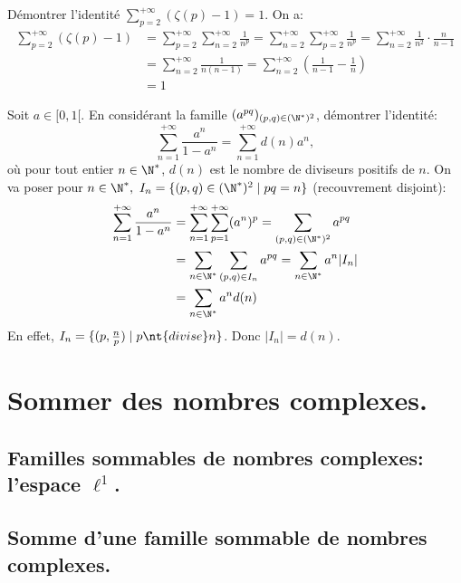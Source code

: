 \documentclass[11pt]{article}
\begin{document}
\begin{ex}{}{}
    Démontrer l'identité \Large$\sum\limits_{p=2}^{+\infty}(\zeta(p)-1)=1$.
    \tcblower
    On a:
    \begin{align*}
        \sum_{p=2}^{+\infty}(\zeta(p)-1) &= \sum_{p=2}^{+\infty}\sum_{n=2}^{+\infty}\frac{1}{n^p}=\sum_{n=2}^{+\infty}\sum_{p=2}^{+\infty}\frac{1}{n^p}=\sum_{n=2}^{+\infty}\frac{1}{n^2}\cdot\frac{n}{n-1}\\
        &=\sum_{n=2}^{+\infty}\frac{1}{n(n-1)}=\sum_{n=2}^{+\infty}\left(\frac{1}{n-1}-\frac{1}{n}\right)\\
        &=1
    \end{align*}
\end{ex}

\begin{ex}{}{}
    Soit $a\in[0,1[$. En considérant la famille $(a^{pq})_{(p,q)\in(\N^*)^2}$, démontrer l'identité:
    \begin{equation*}
        \sum_{n=1}^{+\infty}\frac{a^n}{1-a^n}=\sum_{n=1}^{+\infty}d(n)a^n,
    \end{equation*}
    où pour tout entier $n\in\N^*$, $d(n)$ est le nombre de diviseurs positifs de $n$.
    \tcblower
    On va poser pour $n\in\N^*, ~ I_n=\{(p,q)\in(\N^*)^2\mid pq=n\}$ (recouvrement disjoint):
    \begin{align*}
        \sum_{n=1}^{+\infty}\frac{a^n}{1-a^n}&=\sum_{n=1}^{+\infty}\sum_{p=1}^{+\infty}(a^n)^p=\sum_{(p,q)\in(\N^*)^2}a^{pq}\\
        &=\sum_{n\in\N^*}\sum_{(p,q)\in I_n}a^{pq}=\sum_{n\in\N^*}a^n|I_n|\\
        &=\sum_{n\in\N^*}a^{n}d(n)
    \end{align*}
    En effet, $I_n=\{(p,\frac{n}{p})\mid p \nt{ divise } n\}$. Donc $|I_n|=d(n)$.
\end{ex}

\section{Sommer des nombres complexes.}

\subsection{Familles sommables de nombres complexes: l'espace \texorpdfstring{$\ell^1$}{Lg}.}

\subsection{Somme d'une famille sommable de nombres complexes.}
\end{document}
